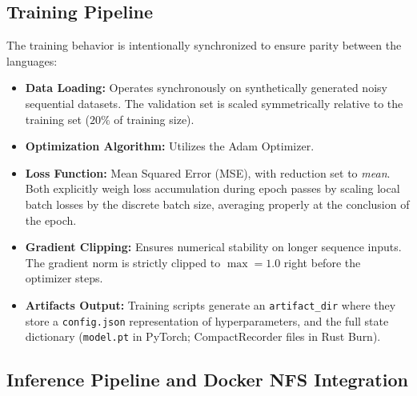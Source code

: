 \documentclass[10pt,a4paper,twocolumn]{article}
\begin{document}
\subsection{Training Pipeline}
The training behavior is intentionally synchronized to ensure parity between the languages:
\begin{itemize}
    \item \textbf{Data Loading:} Operates synchronously on synthetically generated noisy sequential datasets. The validation set is scaled symmetrically relative to the training set ($20\%$ of training size).
    \item \textbf{Optimization Algorithm:} Utilizes the Adam Optimizer.
    \item \textbf{Loss Function:} Mean Squared Error (MSE), with reduction set to \textit{mean}. Both explicitly weigh loss accumulation during epoch passes by scaling local batch losses by the discrete batch size, averaging properly at the conclusion of the epoch.
    \item \textbf{Gradient Clipping:} Ensures numerical stability on longer sequence inputs. The gradient norm is strictly clipped to $\max = 1.0$ right before the optimizer steps.
    \item \textbf{Artifacts Output:} Training scripts generate an \texttt{artifact\_dir} where they store a \texttt{config.json} representation of hyperparameters, and the full state dictionary (\texttt{model.pt} in PyTorch; CompactRecorder files in Rust Burn).
\end{itemize}

\subsection{Inference Pipeline and Docker NFS Integration}
\end{document}
